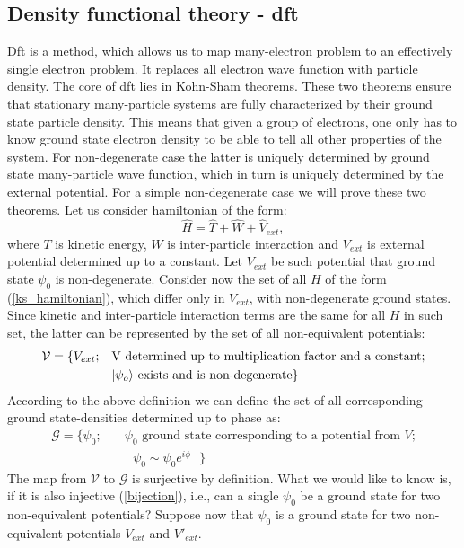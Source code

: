 \documentclass[openany, longbibliography,slovene,a4paper,12pt]{article}
\begin{document}
\subsection{Density functional theory - dft}
Dft is a method, which allows us to map many-electron problem to an effectively
single electron problem. It replaces all electron wave function with
particle density.  The core of dft lies in Kohn-Sham theorems. These two theorems
ensure that stationary many-particle systems are fully characterized by their
ground state particle density. This means that given a group of electrons, one
only has to know ground state electron density to be able to tell all other
properties of the system. For non-degenerate case the latter is uniquely
determined by ground state many-particle wave function, which in turn is
uniquely determined by the external potential. For a simple non-degenerate case
we will prove these two theorems.
Let us consider hamiltonian of the form:
\begin{equation} \label{ks_hamiltonian}
\hat H = \hat T + \hat W + \hat V_{ext},
\end{equation}
where $T$ is kinetic energy, $W$ is inter-particle interaction and $V_{ext}$ is
external potential determined up to a constant. Let $V_{ext}$ be such potential
that ground state $\psi_0$ is non-degenerate. Consider now the set of all $H$ of
the form (\ref{ks_hamiltonian}), which differ only in $V_{ext}$, with
non-degenerate ground states. Since kinetic and inter-particle interaction terms
are the same for all $H$ in such set, the latter can be represented by the set of all non-equivalent potentials:
\begin{equation}
  \begin{split}
    \mathcal{V} = \{V_{ext};\quad &\textrm{V determined up to multiplication factor and a constant;}\\
    & \textrm{$\ket{\psi_o}$ exists and is non-degenerate}\}
    \end{split}
 \end{equation}
According to the above definition we can define the set of all corresponding
ground state-densities determined up to phase as:
\begin{equation}
  \begin{split}
    \mathcal{G} = \{\psi_0; \quad &\textrm{$\psi_0$ ground state corresponding to a potential from $V$;}\\
&\textrm{ $\psi_0\sim\psi_0e^{i\phi}$   }
    \}
    \end{split}
  \end{equation}
The map from $\mathcal{V}$ to $\mathcal{G}$ is surjective by definition. What we
would like to know is, if it is also injective  (\ref{bijection}), i.e., can a
single $\psi_0$ be a ground state for two non-equivalent potentials? Suppose now
that $\psi_0$ is a ground state for two non-equivalent potentials $V_{ext}$ and $V'_{ext}$.
\end{document}
